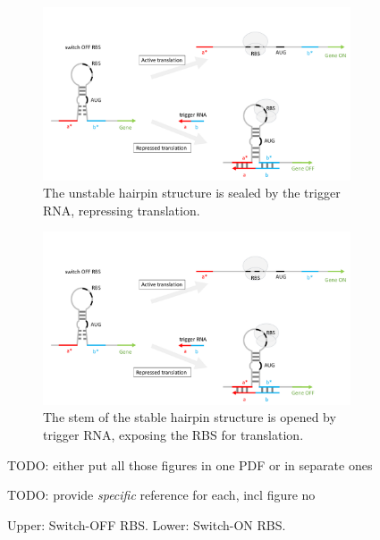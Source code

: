 \documentclass[12pt,notitlepage]{article}
\newcommand{\TODO}[1]{\textrm{\color{red}TODO: #1}}
\newcommand{\ra}[1]{{\color{Blue}#1}}
\begin{document}
\begin{figure}
    \centering
    
    
    \begin{subfigure}{\linewidth}
        \includegraphics[width=\textwidth,page=1]{xor_ribocomputing/switch_off.pdf}
        \caption{%
            \ra{The unstable hairpin structure is sealed by 
            the trigger RNA, repressing translation.}
        }
        \label{f:switch_off_RBS}
    \end{subfigure}
    
    \begin{subfigure}{\linewidth}
        \includegraphics[width=\textwidth,page=2]{xor_ribocomputing/switch_on.pdf}
        \caption{%
            \ra{The stem of the stable hairpin structure 
            is opened by trigger RNA, 
            exposing the RBS for translation.}
        }
        \label{f:switch_on_RBS}
    \end{subfigure}
    
    \caption{Upper: Switch-OFF RBS. Lower: Switch-ON RBS.}
    \label{f:switch_RBS}
    
    \TODO{either put all those figures in one PDF or in separate ones}
    
    \TODO{provide \emph{specific} reference for each, incl figure no}
\end{figure}
\end{document}
